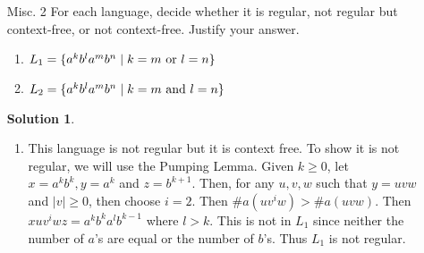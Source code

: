 \documentclass{article}
\newcommand{\setst}{\hspace{1mm} | \hspace{1mm} }
\renewcommand{\epsilon}{\varepsilon}
\theoremstyle{definition}
\newtheorem*{solution*}{Solution}
\begin{document}
\begin{enumerate}
\begin{proof}
\begin{enumerate}
		Thus, $L$ is not context-free so CFL's are not closed under intersection. 
		\item The union of two context-free languages is context-free. Assume that $L_1$ is generated by $G_1 = (N_1,\Sigma_1,P_1,S_1)$ and $L_2$ is generated by $G_2 = (N_2,\Sigma_2,P_2,S_2)$. There may be the case where there are products in $P_1$ and $P_2$ that have the same name. To avoid any issues, rename any names that collide in $P_2$ to a new unique symbol that is not already being used in either set of productions. Denote the renamed productions for $G_2$ as $P_2'$. To accept $L_1 \cup L_2$, construct the following grammar: $G = (N_1 \cup N_2, \Sigma_1 \cup \Sigma_2, P_1 \cup P_2' \cup \{S\},S)$ where $S \rightarrow S_1 | S_2$. Essentially, this construction allows the production to move to either production rules that create strings in $L_1$ or strings in $L_2$. Once the production has moved to $S_1$ or $S_2$, the production proceeds in the same manner as in $G_1$ or $G_2$ respectively modulo the potential name changes in $P_2$.
		\item The $L_1^*$ is a context-free language. Assume that $L_1$ is generated by $G_1 = (N,\Sigma,P,S)$. Consider the following grammar that accepts $L_1^*$: $G = (N, \Sigma, P \cup \{S'\}, S')$ where $S' \rightarrow SS'|\epsilon$. This grammar allows any number of strings in $L_1$ concatenated together since the nonterminal $S' \rightarrow SS'$ can be expanded to $\underbrace{SS\ldots S}_{n \text{ times}}S'$ for $n \geq 0$. The $\epsilon$ term allows this expansion to end eventually so that there is no infinite recursion. 
	\end{enumerate}
\end{proof}
\item[Misc. 2] For each language, decide whether it is regular, not regular but context-free, or not context-free. Justify your answer. 
\begin{enumerate}
	\item $L_1 = \{a^k b^l a^m b^n \setst k = m \text{ or } l = n \}$ 
	\item $L_2 = \{a^k b^l a^m b^n \setst k = m \text{ and } l = n\}$
\end{enumerate}
\begin{solution*}
	\leavevmode
	\begin{enumerate}
			\item This language is not regular but it is context free. To show it is not regular, we will use the Pumping Lemma. Given $k \geq 0$, let $x = a^kb^k, y = a^k$ and $z = b^{k+1}$. Then, for any $u,v,w$ such that $y = uvw$ and $|v| \geq 0$, then choose $i = 2$. Then $\#a(uv^iw) > \#a(uvw)$. Then $xuv^iwz = a^kb^ka^lb^{k-1}$ where $l > k$. This is not in $L_1$ since neither the number of $a$'s are equal or the number of $b$'s. Thus $L_1$ is not regular. 
		

\end{enumerate}
\end{solution*}
\end{enumerate}
\end{document}
